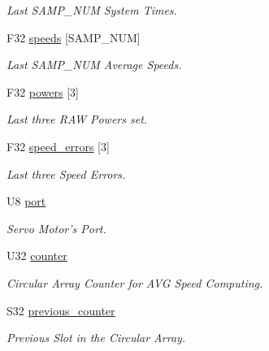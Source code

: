 \begin{DoxyCompactItemize}
\begin{DoxyCompactList}\small\item\em Last SAMP\_\-NUM System Times. \item\end{DoxyCompactList}\item 
F32 \hyperlink{structmotor__t_a4c77ff6da6be3a15bb8fe8523f3909f6}{speeds} \mbox{[}SAMP\_\-NUM\mbox{]}
\begin{DoxyCompactList}\small\item\em Last SAMP\_\-NUM Average Speeds. \item\end{DoxyCompactList}\item 
F32 \hyperlink{structmotor__t_ae99d8af7a3f14d868771f3dad4041d76}{powers} \mbox{[}3\mbox{]}
\begin{DoxyCompactList}\small\item\em Last three RAW Powers set. \item\end{DoxyCompactList}\item 
F32 \hyperlink{structmotor__t_aaa9b86dcf97cbd4ca2af18ca41a17025}{speed\_\-errors} \mbox{[}3\mbox{]}
\begin{DoxyCompactList}\small\item\em Last three Speed Errors. \item\end{DoxyCompactList}\item 
U8 \hyperlink{structmotor__t_afddeb57a376d21ebc28060146d46c608}{port}
\begin{DoxyCompactList}\small\item\em Servo Motor's Port. \item\end{DoxyCompactList}\item 
U32 \hyperlink{structmotor__t_a254d07b5f7c8ed7b181a5e069a438697}{counter}
\begin{DoxyCompactList}\small\item\em Circular Array Counter for AVG Speed Computing. \item\end{DoxyCompactList}\item 
S32 \hyperlink{structmotor__t_aed14003f4afb01bfd7d28c672c4915dc}{previous\_\-counter}
\begin{DoxyCompactList}\small\item\em Previous Slot in the Circular Array. \item\end{DoxyCompactList}\end{DoxyCompactItemize}


